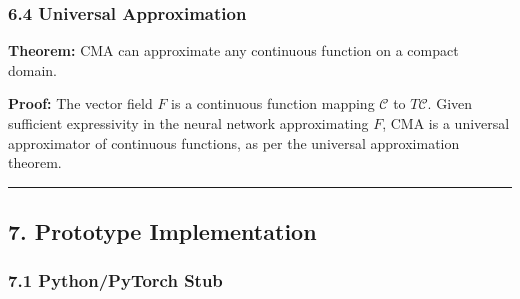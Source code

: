 \documentclass[
  11pt,
  a4paper,
]{article}
\begin{document}
\subsubsection{6.4 Universal
Approximation}\label{universal-approximation}

\textbf{Theorem:} CMA can approximate any continuous function on a
compact domain.

\textbf{Proof:} The vector field \(F\) is a continuous function mapping
\(\mathcal{C}\) to \(T\mathcal{C}\). Given sufficient expressivity in
the neural network approximating \(F\), CMA is a universal approximator
of continuous functions, as per the universal approximation theorem.

\begin{center}\rule{0.5\linewidth}{0.5pt}\end{center}

\subsection{7. Prototype Implementation}\label{prototype-implementation}

\subsubsection{7.1 Python/PyTorch Stub}\label{pythonpytorch-stub}
\end{document}
